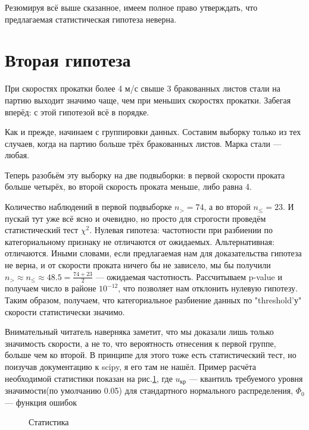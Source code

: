 \documentclass[12pt,a4paper]{report}
\begin{document}
Резюмируя всё выше сказанное, имеем полное право утверждать, что предлагаемая статистическая гипотеза неверна.
\section*{Вторая гипотеза}
При скоростях прокатки более 4 м/с свыше 3 бракованных листов стали на партию выходит значимо чаще, чем при меньших скоростях прокатки. Забегая вперёд: с этой гипотезой всё в порядке.

Как и прежде, начинаем с группировки данных. Составим выборку только из тех случаев, когда на партию больше трёх бракованных листов. Марка стали — любая.

Теперь разобьём эту выборку на две подвыборки: в первой скорости проката больше четырёх, во второй скорость проката меньше, либо равна 4. 

Количество наблюдений в первой подвыборке $n_> = 74$, а во второй $n_{\leq} = 23$. И пускай тут уже всё ясно и очевидно, но просто для строгости проведём статистический тест $\chi^2$. Нулевая гипотеза: частотности при разбиении по категориальному признаку не отличаются от ожидаемых. Альтернативная: отличаются. Иными словами, если предлагаемая нам для доказательства гипотеза не верна, и от скорости проката ничего бы  не зависело, мы бы получили $n_> \approx n_{\leq} \approx 48.5 = \frac{74 + 23}{2}$ — ожидаемая частотность. Рассчитываем p-value и получаем число в районе $10^{-12}$, что позволяет нам отклонить нулевую гипотезу. Таким образом, получаем, что категориальное разбиение данных по "threshold'у" скорости статистически значимо.

Внимательный читатель наверняка заметит, что мы доказали лишь только значимость скорости, а не то, что вероятность отнесения к первой группе, больше чем ко второй. В принципе для этого тоже есть статистический тест, но поизучав документацию к scipy, я его там не нашёл. Пример расчёта необходимой статистики показан на рис.\ref{fig:test}, где $u_{кр}$ — квантиль требуемого уровня значимости(по умолчанию 0.05) для стандартного нормального распределения, $\Phi_0$ — функция ошибок 
\begin{figure}[h]
	\caption{Статистика}
	\label{fig:test}
\end{figure}
\end{document}
